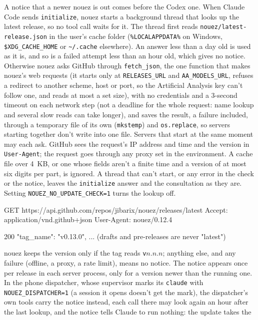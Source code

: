 \documentclass[10pt,a4paper]{article}
\newcommand{\code}[1]{\texttt{#1}}
\begin{document}
A notice that a newer nouez is out comes before the Codex one. When Claude Code sends
\code{initialize}, nouez starts a background thread that looks up the latest release, so no tool
call waits for it. The thread first reads \code{nouez/latest-release.json} in the user's cache
folder (\code{\%LOCALAPPDATA\%} on Windows, \code{\$XDG\_CACHE\_HOME} or
\code{\textasciitilde/.cache} elsewhere). An answer less than a day old is used as it is, and so
is a failed attempt less than an hour old, which gives no notice. Otherwise nouez asks GitHub through \code{fetch\_json}, the one function that makes nouez's
web requests (it starts only at \code{RELEASES\_URL} and \code{AA\_MODELS\_URL}, refuses a redirect
to another scheme, host or port, so the Artificial Analysis key can't follow one, and reads at
most a set size),
with no credentials and a 3-second timeout on each network step (not a deadline for the whole
request: name lookup and several slow reads can take longer), and saves the result, a failure
included, through a temporary file of its own (\code{mkstemp}) and \code{os.replace}, so servers
starting together don't write into one file. Servers that start at the same moment may each ask.
GitHub sees the request's IP address and time and the version in \code{User-Agent}; the request
goes through any proxy set in the environment. A cache file over 4~KB, or one whose fields aren't a
finite time and a version of at most six digits per part, is ignored. A thread that can't start, or
any error in the check or the notice, leaves the \code{initialize} answer and the consultation as
they are. Setting \code{NOUEZ\_NO\_UPDATE\_CHECK=1} turns the lookup off.
\begin{plain}
GET https://api.github.com/repos/jibarix/nouez/releases/latest
Accept: application/vnd.github+json
User-Agent: nouez/0.12.4

200 {"tag_name": "v0.13.0", ...}             (drafts and pre-releases are never "latest")
\end{plain}
nouez keeps the version only if the tag reads \code{v}$n.n.n$; anything else, and any failure
(offline, a proxy, a rate limit), means no notice. The notice appears once per release in each
server process, only for a version newer than the running one. In the phone dispatcher, whose
supervisor marks its \code{claude} with \code{NOUEZ\_DISPATCHER=1} (a session it opens doesn't get
the mark), the dispatcher's own tools carry the notice instead, each call there may look again an
hour after the last lookup, and the notice tells Claude to run nothing: the update takes the
\end{document}
